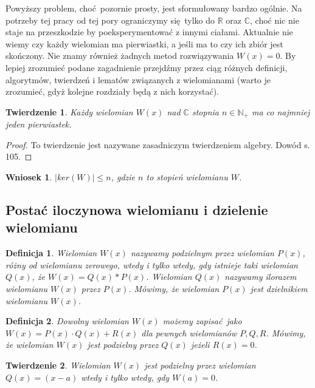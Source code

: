 \documentclass{article}
\newtheorem{thm}{Twierdzenie}
\newtheorem{wniosek}{Wniosek}
\newtheorem{definicja}{Definicja}
\begin{document}
Powyższy problem, choć pozornie prosty, jest sformułowany bardzo ogólnie. Na potrzeby tej pracy od tej pory ograniczymy się tylko do $\mathbb{R}$ oraz $\mathbb{C}$, choć nic nie staje na przeszkodzie by poeksperymentować z innymi ciałami. Aktualnie nie wiemy czy każdy wielomian ma pierwiastki, a jeśli ma to czy ich zbiór jest skończony. Nie znamy również żadnych metod rozwiązywania $W(x) = 0$. By lepiej zrozumieć podane zagadnienie przejdźmy przez ciąg różnych definicji, algorytmów, twierdzeń i lematów związanych z wielomianami (warto je zrozumieć, gdyż kolejne rozdziały będą z nich korzystać).

\begin{thm}
Każdy wielomian $W(x)$ nad $\mathbb{C}$ stopnia $n \in \mathbb{N}_+$ ma co najmniej jeden pierwiastek.
\end{thm}

\begin{proof}
To twierdzenie jest nazywane zasadniczym twierdzeniem algebry. Dowód \cite{leja} s. 105.
\end{proof}

\begin{wniosek}
$| ker(W) | \leq n$, gdzie $n$ to stopień wielomianu $W$.	
\end{wniosek}


\subsection{Postać iloczynowa wielomianu i dzielenie wielomianu}


\begin{definicja}
Wielomian $W(x)$ nazywamy podzielnym przez wielomian $P(x)$, różny od wielomianu zerowego, wtedy i tylko wtedy, gdy istnieje taki wielomian $Q(x)$, że $W(x) = Q(x) * P(x)$. Wielomian $Q(x)$ nazywamy ilorazem wielomianu $W(x)$ przez $P(x)$. Mówimy, że wielomian $P(x)$ jest dzielnikiem wielomianu $W(x)$.
\end{definicja}


\begin{definicja}
Dowolny wielomian $W(x)$ możemy zapisać jako $W(x) = P(x) \cdot Q(x) + R(x)$ dla pewnych wielomianów $P, Q, R$. Mówimy, że wielomian $W(x)$ jest podzielny przez $Q(x)$ jeżeli $R(x) = 0$. 
\end{definicja}

\begin{thm}
Wielomian $W(x)$ jest podzielny przez wielomian $Q(x) = (x-a)$ wtedy i tylko wtedy, gdy $W(a) = 0$.	
\end{thm}
\end{document}
